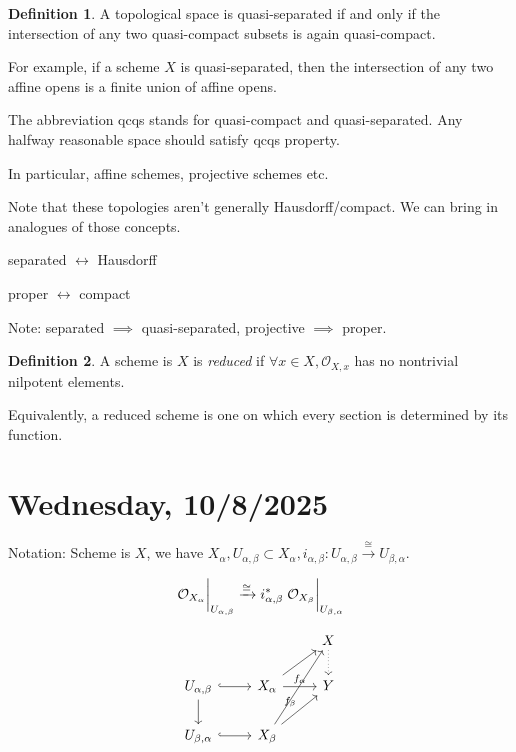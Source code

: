 \documentclass{article}
\theoremstyle{definition}
\newtheorem*{definition}{Definition}
\begin{document}
    \begin{definition}
        A topological space is quasi-separated if and only if the intersection of any two quasi-compact subsets is again quasi-compact.
    \end{definition}

    For example, if a scheme \(X\) is quasi-separated, then the intersection of any two affine opens is a finite union of affine opens.

    The abbreviation qcqs stands for quasi-compact and quasi-separated. Any halfway reasonable space should satisfy qcqs property.

    In particular, affine schemes, projective schemes etc.

    Note that these topologies aren't generally Hausdorff/compact. We can bring in analogues of those concepts.

    separated \(\leftrightarrow\) Hausdorff

    proper \(\leftrightarrow\) compact

    Note: separated \(\implies\) quasi-separated, projective \(\implies\) proper.

    \begin{definition}
        A scheme is \(X\) is \textit{reduced} if \(\forall x\in X, \mathcal{O}_{X,x}\) has no nontrivial nilpotent elements.

        Equivalently, a reduced scheme  is one on which every section is determined by its function.
    \end{definition}

    \section*{Wednesday, 10/8/2025}
    
    Notation: Scheme is \(X\), we have \(X_\alpha, U_{\alpha , \beta} \subset X_\alpha, i_{\alpha,\beta} : U_{\alpha ,\beta} \xrightarrow{\cong} U_{\beta,\alpha}\).
    
    \[
        \eval{\mathcal{O}_{X_\alpha}}_{U_{\alpha,\beta}} \xrightarrow{\cong} i_{\alpha ,\beta}^{\ast} \eval{\mathcal{O}_{X_\beta}}_{U_{\beta,\alpha}}
    \]

    \[
        \begin{tikzcd}
            & & X \ar[d, dotted] \\
            U_{\alpha,\beta} \ar[r, hook] \ar[d] & X_\alpha \ar[r, "f_\alpha"] \ar[ur] & Y \\ U_{\beta,\alpha} \ar[r, hook] & X_\beta \ar[ur, "f_\beta"] \ar[uur]
        \end{tikzcd}
    \]
\end{document}
